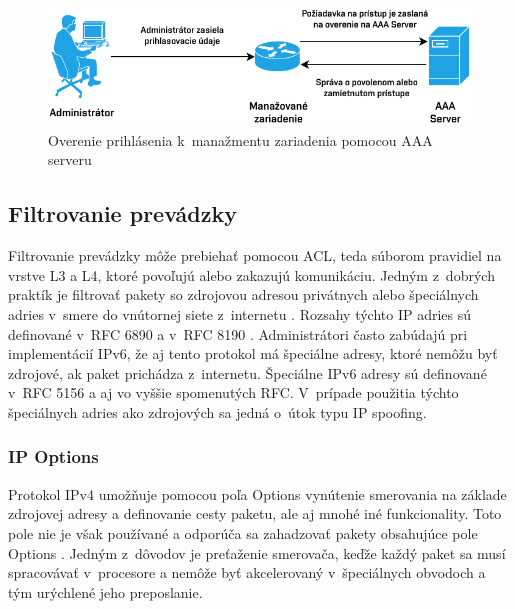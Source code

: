 \begin{figure}[H]
	\begin{center}
		\includegraphics[scale=1.1]{obrazky/AAA.pdf}
	\end{center}
	\caption[Overenie prihlásenia k~manažmentu zariadenia pomocou AAA serveru]{Overenie prihlásenia k~manažmentu zariadenia pomocou AAA serveru}
	\label{fig:aaa-mngmt}
\end{figure} 



\subsection*{Filtrovanie prevádzky}
Filtrovanie prevádzky môže prebiehať pomocou ACL, teda súborom pravidiel na vrstve L3 a L4, ktoré povoľujú alebo zakazujú komunikáciu. Jedným z~dobrých praktík je filtrovať pakety so zdrojovou adresou privátnych alebo špeciálnych adries v~smere do vnútornej siete z~internetu \cite{Jackson2010}. Rozsahy týchto IP adries sú definované v~RFC 6890 \cite{rfc6890al6BqxiLuoAdpLeG} a v~RFC 8190 \cite{rfc8190O1cp1uhrCiYj0LYK}. Administrátori často zabúdajú pri implementácií IPv6, že aj tento protokol má špeciálne adresy, ktoré nemôžu byť zdrojové, ak paket prichádza z~internetu. Špeciálne IPv6 adresy sú definované v~RFC 5156 \cite{rfc5156lPYdBFaqWC5RwyJI} a aj vo vyššie spomenutých RFC. V~prípade použitia týchto špeciálnych adries ako zdrojových sa jedná o~útok typu IP spoofing.

\subsubsection*{IP Options}
Protokol IPv4 umožňuje pomocou poľa Options vynútenie smerovania na základe zdrojovej adresy a definovanie cesty paketu, ale aj mnohé iné funkcionality. Toto pole nie je však používané a odporúča sa zahadzovať pakety obsahujúce pole Options \cite{Singh2018}. Jedným z~dôvodov je preťaženie smerovača, keďže každý paket sa musí spracovávať v~procesore a nemôže byť akcelerovaný v~špeciálnych obvodoch a tým urýchlené jeho preposlanie. 

